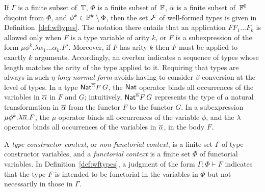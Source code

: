 \documentclass{lmcs}
\theoremstyle{plain}\newtheorem{satz}[thm]{Satz}
\begin{document}
If $\Gamma$ is a finite subset of\, $\mathbb{T}$, $\Phi$ is a finite
subset of\, $\mathbb{F}$, $\overline{\alpha}$ is a finite subset of\,
$\mathbb{F}^0$ disjoint from $\Phi$, and $\phi^k \in \mathbb{F}^k \setminus
\Phi$, then the set $\mathcal{F}$ of well-formed types is given in
Definition~\ref{def:wftypes}. The notation there entails that an
application $F F_1...F_k$ is allowed only when $F$ is a type variable
of arity $k$, or $F$ is a subexpression of the form $\mu
\phi^{k}.\lambda \alpha_1...\alpha_k.F'$. Moreover, if $F$ has arity
$k$ then $F$ must be applied to exactly $k$ arguments.  Accordingly,
an overbar indicates a sequence of types whose length matches the
arity of the type applied to it.  Requiring that types are always in
such \emph{$\eta$-long normal form} avoids having to consider
$\beta$-conversion at the level of types. In a type
$\mathsf{Nat}^{\overline{\alpha}}F\,G$, the $\mathsf{Nat}$ operator binds all occurrences of
the variables in $\overline{\alpha}$ in $F$ and $G$; intuitively,
$\mathsf{Nat}^{\overline{\alpha}}F\,G$ represents the type of a natural
transformation in $\overline{\alpha}$ from the functor $F$ to the functor
$G$.  In a subexpression $\mu \phi^k.\lambda \overline{\alpha}.F$, the $\mu$
operator binds all occurrences of the variable $\phi$, and the
$\lambda$ operator binds all occurrences of the variables in
$\overline{\alpha}$, in the body $F$.

A {\em type constructor context}, or {\em non-functorial context}, is
a finite set $\Gamma$ of type constructor variables, and a {\em
  functorial context} is a finite set $\Phi$ of functorial
variables. In Definition~\ref{def:wftypes}, a judgment of the form
$\Gamma;\Phi \vdash F$ indicates that the type $F$ is intended to be
functorial in the variables in $\Phi$ but not necessarily in those in
$\Gamma$.
\end{document}
